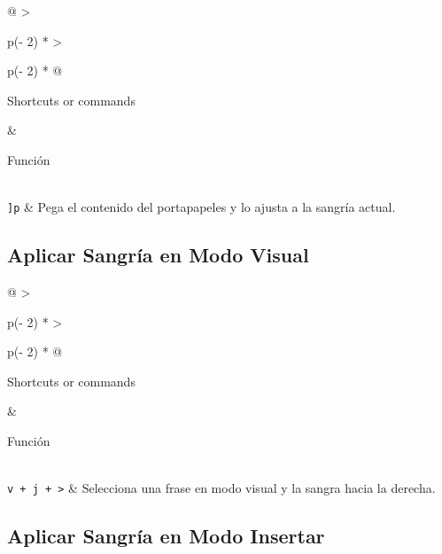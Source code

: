 \documentclass[
  a4paper,
]{article}
\begin{document}
\begin{longtable}[]{@{}
  >{\raggedright\arraybackslash}p{(\columnwidth - 2\tabcolsep) * }
  >{\raggedright\arraybackslash}p{(\columnwidth - 2\tabcolsep) * }@{}}
\toprule\noalign{}
\begin{minipage}[b]{\linewidth}\raggedright
Shortcuts or commands
\end{minipage} & \begin{minipage}[b]{\linewidth}\raggedright
Función
\end{minipage} \\
\midrule\noalign{}
\endhead
\bottomrule\noalign{}
\endlastfoot
\texttt{{]}p} & Pega el contenido del portapapeles y lo ajusta a la
sangría actual. \\
\end{longtable}

\hypertarget{aplicar-sangruxeda-en-modo-visual}{%
\subsection{Aplicar Sangría en Modo
Visual}\label{aplicar-sangruxeda-en-modo-visual}}

\begin{longtable}[]{@{}
  >{\raggedright\arraybackslash}p{(\columnwidth - 2\tabcolsep) * }
  >{\raggedright\arraybackslash}p{(\columnwidth - 2\tabcolsep) * }@{}}
\toprule\noalign{}
\begin{minipage}[b]{\linewidth}\raggedright
Shortcuts or commands
\end{minipage} & \begin{minipage}[b]{\linewidth}\raggedright
Función
\end{minipage} \\
\midrule\noalign{}
\endhead
\bottomrule\noalign{}
\endlastfoot
\texttt{v\ +\ j\ +\ \textgreater{}} & Selecciona una frase en modo
visual y la sangra hacia la derecha. \\
\end{longtable}

\hypertarget{aplicar-sangruxeda-en-modo-insertar}{%
\subsection{Aplicar Sangría en Modo
Insertar}\label{aplicar-sangruxeda-en-modo-insertar}}
\end{document}
